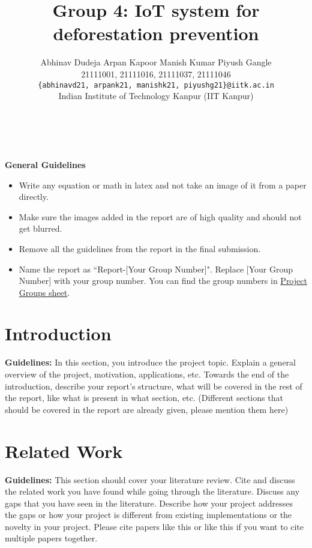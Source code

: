 \documentclass[11pt, oneside]{article}   	%
\title{Group 4: IoT system for deforestation prevention}
\author{
    Abhinav Dudeja \qquad   
    Arpan Kapoor \qquad
    Manish Kumar \quad
    Piyush Gangle \\
   21111001, 21111016, 21111037, 21111046 \\
   {\tt \{abhinavd21, arpank21, manishk21, piyushg21\}@iitk.ac.in}\\
{Indian Institute of Technology Kanpur (IIT Kanpur)}
}
\date{}							%
\begin{document}
\maketitle

\\
\\
\noindent \textbf{\fontsize{13pt}{12pt}\selectfont General Guidelines}
\begin{itemize}
    \item Write any equation or math in latex and not take an image of it from a paper directly.
    \item Make sure the images added in the report are of high quality and should not get blurred.
    \item Remove all the guidelines from the report in the final submission.
    \item Name the report as ``Report-[Your Group Number]". Replace [Your Group Number] with your group number. You can find the group numbers in \href{https://docs.google.com/spreadsheets/d/123XoA5jyapDe3X_4IUsoFQ2nh4eEvIMQGKunq0jSohg/edit#gid=987598356}{Project Groups sheet}. 
\end{itemize}
    
\section{Introduction}

\textbf{Guidelines:} In this section, you introduce the project topic. Explain a general overview of the project, motivation, applications, etc. Towards the end of the introduction, describe your report's structure, what will be covered in the rest of the report, like what is present in what section, etc. (Different sections that should be covered in the report are already given, please mention them here)\\ 

\section{Related Work}
\textbf{Guidelines:} This section should cover your literature review. Cite and discuss the related work you have found while going through the literature. Discuss any gaps that you have seen in the literature. Describe how your project addresses the gaps or how your project is different from existing implementations or the novelty in your project.  
Please cite papers like this \cite{9445290} or like this \cite{9445290, 7821693} if you want to cite multiple papers together. 
\end{document}
